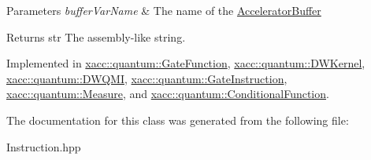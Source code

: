 \begin{DoxyParams}{Parameters}
{\em buffer\+Var\+Name} & The name of the \hyperlink{a00013}{Accelerator\+Buffer} \\
\hline
\end{DoxyParams}
\begin{DoxyReturn}{Returns}
str The assembly-\/like string. 
\end{DoxyReturn}


Implemented in \hyperlink{a00041_aa1950776ae84bad2d0795a0441f910e7}{xacc\+::quantum\+::\+Gate\+Function}, \hyperlink{a00032_adbc3fdd080ebba20bc620b8832979f16}{xacc\+::quantum\+::\+D\+W\+Kernel}, \hyperlink{a00033_a8d8742bb6743cf6e49f95966d05bbec2}{xacc\+::quantum\+::\+D\+W\+Q\+MI}, \hyperlink{a00042_a089a5da67ff40ac1a6f56e64589822d9}{xacc\+::quantum\+::\+Gate\+Instruction}, \hyperlink{a00056_a1c51a5d68294dcb2ba1a9fbea63a730f}{xacc\+::quantum\+::\+Measure}, and \hyperlink{a00025_aca7a5f849fece6fc28a904efee9a3370}{xacc\+::quantum\+::\+Conditional\+Function}.



The documentation for this class was generated from the following file\+:\begin{DoxyCompactItemize}
\item 
Instruction.\+hpp\end{DoxyCompactItemize}
